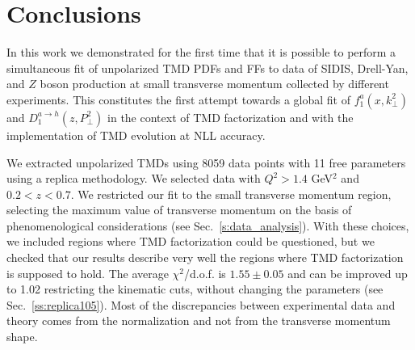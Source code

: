 \documentclass[aps,preprintnumbers,showpacs,nofootinbib,superscriptaddress,floatfix]{revtex4}
\begin{document}





\section{Conclusions}
\label{s:conclusions}


In this work we demonstrated for the first time that it is possible 
to perform a
simultaneous fit of unpolarized TMD PDFs and FFs 
to data of SIDIS, Drell-Yan, and $Z$
boson production at small transverse momentum collected by different experiments. 
This constitutes the first attempt towards a global fit of 
$f_1^a(x,k_\perp^2)$ and $D_1^{a \to h}(z,P_\perp^2)$ in the context of TMD
factorization and with the implementation of 
TMD evolution at NLL accuracy. %
  
We extracted unpolarized TMDs using 8059 data points with 11 free parameters
using a replica methodology. We selected data with 
$Q^2 > 1.4$ GeV$^2$ and $0.2 < z < 0.7$. We restricted our fit to the small
transverse momentum region, selecting the maximum value of transverse momentum
on the basis of phenomenological considerations
(see Sec.~\ref{s:data_analysis}). With these choices, 
we included regions where TMD
factorization could be questioned, but we checked that our results describe 
very well the regions where TMD factorization is supposed to hold. 
The average $\chi^2$/d.o.f. is $1.55 \pm 0.05$ and can be improved up to 1.02
restricting the kinematic cuts, without changing the parameters (see Sec.~\ref{ss:replica105}). 
Most of the discrepancies between experimental data and theory comes from the
normalization and not from the transverse momentum shape. 
\end{document}
